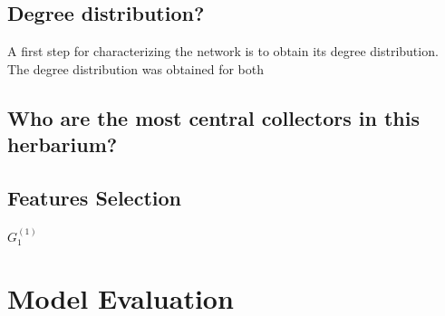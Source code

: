 

\subsection{Degree distribution?}

A first step for characterizing the network is to obtain its degree distribution.
The degree distribution was obtained for both 


\subsection{Who are the most central collectors in this herbarium?}





\subsection{Features Selection}

\newcommand{\G}[1]{G^{(1)}_{#1}}
$\G1$

\section{Model Evaluation}


